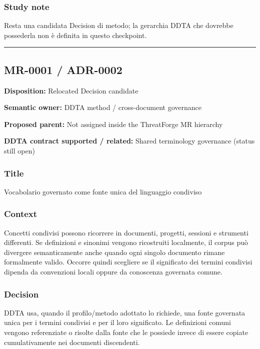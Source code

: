 \documentclass[
  10pt,
  a4paper,
]{article}
\begin{document}
\subsubsection{Study note}\label{study-note}

Resta una candidata Decision di metodo; la gerarchia DDTA che dovrebbe
possederla non è definita in questo checkpoint.

\begin{center}\rule{0.5\linewidth}{0.5pt}\end{center}

\subsection{MR-0001 / ADR-0002}\label{mr-0001-adr-0002}

\textbf{Disposition:} Relocated Decision candidate

\textbf{Semantic owner:} DDTA method / cross-document governance

\textbf{Proposed parent:} Not assigned inside the ThreatForge MR
hierarchy

\textbf{DDTA contract supported / related:} Shared terminology
governance (status still open)

\subsubsection{Title}\label{title-1}

Vocabolario governato come fonte unica del linguaggio condiviso

\subsubsection{Context}\label{context-1}

Concetti condivisi possono ricorrere in documenti, progetti, sessioni e
strumenti differenti. Se definizioni e sinonimi vengono ricostruiti
localmente, il corpus può divergere semanticamente anche quando ogni
singolo documento rimane formalmente valido. Occorre quindi scegliere se
il significato dei termini condivisi dipenda da convenzioni locali
oppure da conoscenza governata comune.

\subsubsection{Decision}\label{decision-1}

DDTA usa, quando il profilo/metodo adottato lo richiede, una fonte
governata unica per i termini condivisi e per il loro significato. Le
definizioni comuni vengono referenziate o risolte dalla fonte che le
possiede invece di essere copiate cumulativamente nei documenti
discendenti.
\end{document}
